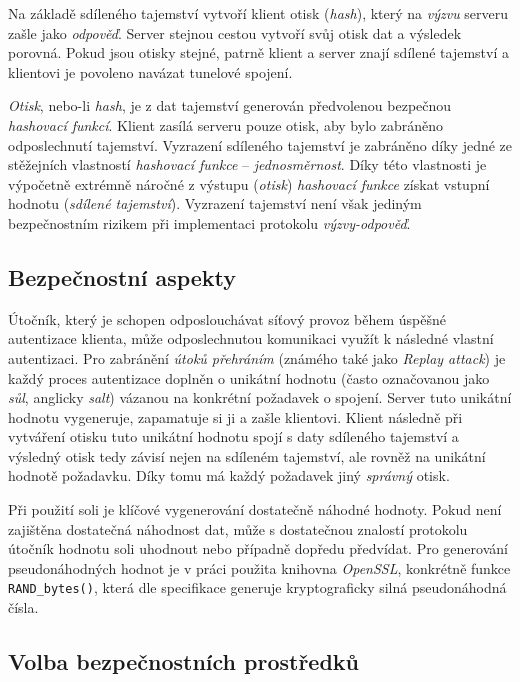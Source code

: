 \documentclass[thesis=M,czech]{FITthesis}[2012/10/20]
\begin{document}
Na základě sdíleného tajemství vytvoří klient otisk (\textit{hash}), který na \textit{výzvu} serveru zašle jako \textit{odpověď}. Server stejnou cestou vytvoří svůj otisk dat a výsledek porovná. Pokud jsou otisky stejné, patrně klient a server znají sdílené tajemství a klientovi je povoleno navázat tunelové spojení.

\textit{Otisk}, nebo-li \textit{hash}, je z dat tajemství generován předvolenou bezpečnou \textit{hashovací funkcí}. Klient zasílá serveru pouze otisk, aby bylo zabráněno odposlechnutí tajemství. Vyzrazení sdíleného tajemství je zabráněno díky jedné ze stěžejních vlastností \textit{hashovací funkce} -- \textit{jednosměrnost}. Díky této vlastnosti je výpočetně extrémně náročné z výstupu (\textit{otisk}) \textit{hashovací funkce} získat vstupní hodnotu (\textit{sdílené tajemství}). Vyzrazení tajemství není však jediným bezpečnostním rizikem při implementaci protokolu \textit{výzvy-odpověď}.

\subsection{Bezpečnostní aspekty}

Útočník, který je schopen odposlouchávat síťový provoz během úspěšné autentizace klienta, může odposlechnutou komunikaci využít k následné vlastní autentizaci. Pro zabránění \textit{útoků přehráním} (známého také jako \textit{Replay attack}) je každý proces autentizace doplněn o unikátní hodnotu (často označovanou jako \textit{sůl}, anglicky \textit{salt}) vázanou na konkrétní požadavek o spojení. Server tuto unikátní hodnotu vygeneruje, zapamatuje si ji a zašle klientovi. Klient následně při vytváření otisku tuto unikátní hodnotu spojí s daty sdíleného tajemství a výsledný otisk tedy závisí nejen na sdíleném tajemství, ale rovněž na unikátní hodnotě požadavku. Díky tomu má každý požadavek jiný \textit{správný} otisk.

Při použití soli je klíčové vygenerování dostatečně náhodné hodnoty. Pokud není zajištěna dostatečná náhodnost dat, může s dostatečnou znalostí protokolu útočník hodnotu soli uhodnout nebo případně dopředu předvídat. Pro generování pseudonáhodných hodnot je v práci použita knihovna \textit{OpenSSL}, konkrétně funkce \texttt{RAND\_bytes()}, která dle specifikace\cite{openssl-randbytes} generuje kryptograficky silná pseudonáhodná čísla.

\subsection{Volba bezpečnostních prostředků}
\end{document}
